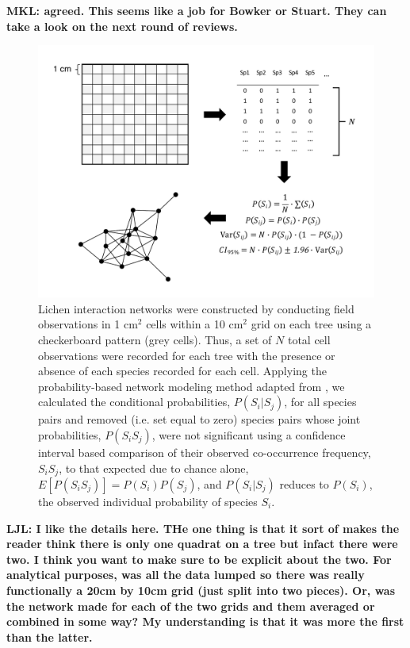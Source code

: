 \documentclass[11pt,twocolumn,twoside,lineno]{pnas-new}
\begin{document}
{\textbf{MKL: agreed. This seems like a job for Bowker or Stuart. They
  can take a look on the next round of reviews.}

\begin{figure}[ht]
\centering
\includegraphics[width=\linewidth]{lcn_araujo_method.pdf}
\caption{Lichen interaction networks were constructed by conducting
  field observations in 1 cm$^2$ cells within a 10 cm$^2$ grid on each
  tree using a checkerboard pattern (grey cells). Thus, a set of $N$
  total cell observations were recorded for each tree with the
  presence or absence of each species recorded for each cell. Applying
  the probability-based network modeling method adapted from
  \cite{Araujo2011}, we calculated the conditional probabilities,
  $P(S_i|S_j)$, for all species pairs and removed (i.e. set equal to
  zero) species pairs whose joint probabilities, $P(S_i S_j)$, were
  not significant using a confidence interval based comparison of
  their observed co-occurrence frequency, $S_iS_j$, to that expected
  due to chance alone, $E[P(S_iS_j)] = P(S_i) P(S_j)$, and
  $P(S_i|S_j)$ reduces to $P(S_i)$, the observed individual
  probability of species $S_i$.}
\label{fig:conet_method}
\end{figure}


\textbf{LJL: I like the details here. THe one thing is that it sort of
  makes the reader think there is only one quadrat on a tree but
  infact there were two. I think you want to make sure to be explicit
  about the two. For analytical purposes, was all the data lumped so
  there was really functionally a 20cm by 10cm grid (just split into
  two pieces). Or, was the network made for each of the two grids and
  them averaged or combined in some way? My understanding is that it
  was more the first than the latter.}

}
\end{document}

